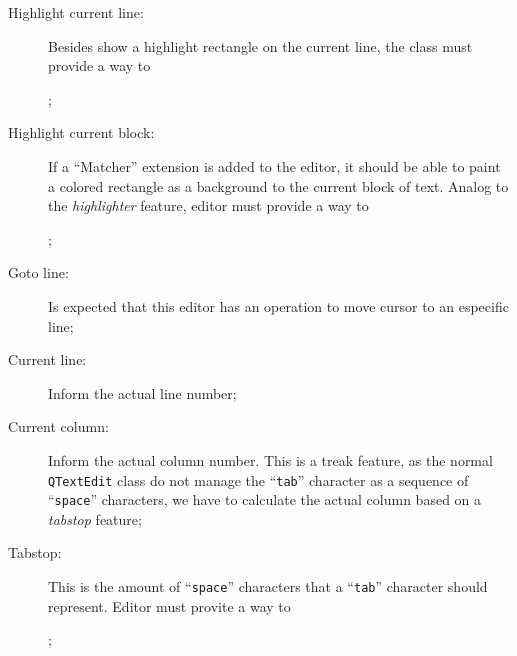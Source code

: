 \documentclass[11pt,a4paper]{report}
\begin{document}
\begin{description}
\item[Highlight current line:] Besides show a highlight rectangle on the current line, the class must provide a way to ;

\item[Highlight current block:] If a ``Matcher'' extension is added to the editor, it should be able to paint a colored rectangle as a background to the current block of text. Analog to the \textit{highlighter} feature, editor must provide a way to ;

\item[Goto line:] Is expected that this editor has an operation to move cursor to an especific line;

\item[Current line:] Inform the actual line number;

\item[Current column:] Inform the actual column number. This is a treak feature, as the normal \texttt{QTextEdit} class do not manage the ``\texttt{tab}'' character as a sequence of ``\texttt{space}'' characters, we have to calculate the actual column based on a \textit{tabstop} feature;

\item[Tabstop:] This is the amount of ``\texttt{space}'' characters that a ``\texttt{tab}'' character should represent. Editor must provite a way to ;


\end{description}
\end{document}
